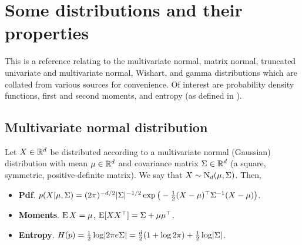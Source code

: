 \section{Some distributions and their properties}

This is a reference relating to the multivariate normal,  matrix normal, truncated univariate and multivariate normal, Wishart, and gamma distributions which are  collated from various sources for convenience.
Of interest are probability density functions, first and second moments, and entropy (as defined in ).

\subsection{Multivariate normal distribution}

Let $X\in\bbR^d$ be distributed according to a multivariate normal (Gaussian) distribution with mean $\mu \in \bbR^d$ and covariance matrix $\Sigma \in\bbR^d$ (a square, symmetric, positive-definite matrix).
We say that $X\sim\N_d(\mu,\Sigma)$.
Then,
\begin{itemize}
  \item \textbf{Pdf}. $p(X|\mu,\Sigma) = (2\pi)^{-d/2}|\Sigma|^{-1/2}\exp\big(-\half (X-\mu)^\top\Sigma^{-1}(X-\mu)\big)$.
  \item \textbf{Moments}. $\E X=\mu$, $\E [XX^\top] = \Sigma + \mu \mu^\top$.
  \item \textbf{Entropy}. $H(p) = \half \log \abs{2\pi e \Sigma} = \half[d](1 + \log 2\pi) + \half\log\abs{\Sigma}$.
\end{itemize}

